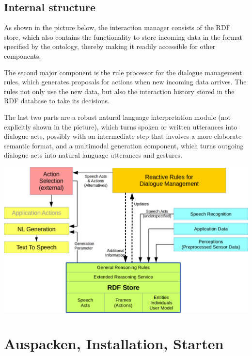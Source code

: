 \documentclass[a4paper]{memoir}
\begin{document}
\section{Internal structure}

As shown in the picture below, the interaction manager consists of the RDF
store, which also contains the functionality to store incoming data in the
format specified by the ontology, thereby making it readily accessible for
other components.

The second major component is the rule processor for the dialogue management
rules, which generates proposals for actions when new incoming data
arrives. The rules not only use the new data, but also the interaction history
stored in the RDF database to take its decisions.

The last two parts are a robust natural language interpretation module (not
explicitly shown in the picture), which turns spoken or written utterances
into dialogue acts, possibly with an intermediate step that involves a more
elaborate semantic format, and a multimodal generation component, which turns
outgoing dialogue acts into natural language utterances and gestures.

\vspace*{4ex}

\includegraphics[width=.9\textwidth]{rudimant.png}



\chapter{Auspacken, Installation, Starten}




\end{document}
